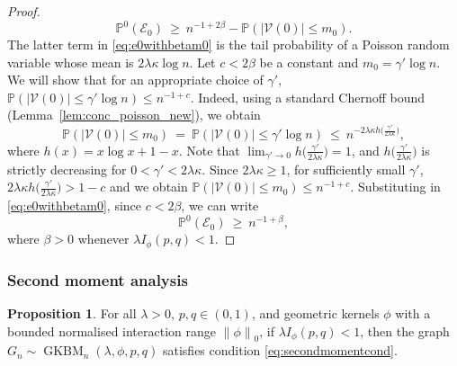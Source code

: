 \documentclass[letterpaper,11pt]{article}
\newtheorem{prop}[thm]{Proposition}
\theoremstyle{definition}
\def\P{\mathbb{P}}
\def\cE{\mathcal{E}}
\def\cV{\mathcal{V}}
\def\weq{ \ = \ }
\def\wge{ \ \ge \ }
\def\wle{ \ \le \ }
\newcommand{\zeronorm}[1]{{\lVert#1\rVert}_0}
\numberwithin{equation}{section}
\newcommand{\GKBM}{\operatorname{GKBM}}
\newcommand{\ga}{\gamma}
\newcommand{\ka}{\kappa}
\newcommand{\la}{\lambda}
\newtheorem{prop}[thm]{Proposition}
\theoremstyle{definition}
\def\P{\mathbb{P}}
\def\cE{\mathcal{E}}
\def\cV{\mathcal{V}}
\def\weq{ \ = \ }
\def\wge{ \ \ge \ }
\def\wle{ \ \le \ }
\newcommand{\zeronorm}[1]{{\lVert#1\rVert}_0}
\numberwithin{equation}{section}
\newcommand{\GKBM}{\operatorname{GKBM}}
\newcommand{\ga}{\gamma}
\newcommand{\ka}{\kappa}
\newcommand{\la}{\lambda}
\theoremstyle{thmstyletwo}%
\begin{document}
\begin{proof}
\begin{equation}
\P^0(\cE_0 )
\wge n^{-1+2\beta} -\P(|\cV(0)| \le m_0).
\label{eq:e0withbetam0}
\end{equation}
The latter term in \eqref{eq:e0withbetam0} is the tail probability of a Poisson random variable whose mean is $2\la \ka \log n$. Let $c<2\beta$ be a constant and $m_0 = \ga' \log n$. We will show that for an appropriate choice of $\ga'$, $\P(|\cV(0)| \le \ga' \log n) \le n^{-1+c}$. Indeed,
using a standard Chernoff bound (Lemma~\ref{lem:conc_poisson_new}), we obtain
\[
\P(|\cV(0)| \le m_0) 
\weq \P(|\cV(0)| \le \ga' \log n)
\wle n^{-2 \la \ka h\big(\frac{\ga'}{2 \la \ka}\big)},
\]
where
$h(x) = x \log x + 1 - x$.
Note that $\lim_{\ga'\to 0}h\big(\frac{\ga'}{2 \la \ka}\big) = 1$, and $h\big(\frac{\ga'}{2 \la \ka}\big)$ is strictly decreasing for $0<\ga'<2\la \ka$. Since $2\la \ka \ge 1$, for sufficiently small $\ga'$, $2 \la \ka h\big(\frac{\ga'}{2 \la \ka}\big) >1-c$ and we obtain $\P(|\cV(0)| \le m_0) \le n^{-1+c}$. Substituting in \eqref{eq:e0withbetam0}, since $c<2\beta$, we can write
\[
\P^0(\cE_0 )
\wge n^{-1+\beta},
\]
where $\beta>0$ whenever $\la I_{\phi}(p,q)<1$.
\end{proof}


\subsubsection{Second moment analysis}
\label{sec:second_moment}
\begin{prop}
For all $\la >0$, $p, q \in (0,1)$, and geometric kernels $\phi$ with a bounded normalised interaction range $\zeronorm{\phi}$, if $\la I_\phi(p,q) < 1$, then the graph $G_n \sim \GKBM_n(\la, \phi, p, q)$ satisfies condition \eqref{eq:secondmomentcond}.
\label{prop:second_momentz}
\end{prop}
\end{document}
